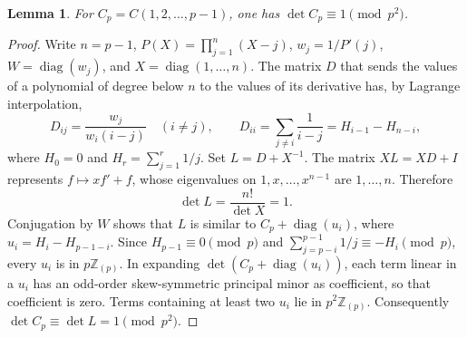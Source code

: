 \documentclass[11pt]{article}
\newtheorem{lemma}[theorem]{Lemma}
\newcommand{\Zp}{\mathbb Z_{(p)}}
\begin{document}
\begin{lemma}\label{canonical}
For $C_p=C(1,2,\ldots,p-1)$, one has
$\det C_p\equiv1\pmod{p^2}$.
\end{lemma}
\begin{proof}
Write $n=p-1$, $P(X)=\prod_{j=1}^n(X-j)$, $w_j=1/P'(j)$,
$W=\operatorname{diag}(w_j)$, and $X=\operatorname{diag}(1,\ldots,n)$.
The matrix $D$ that sends the values of a polynomial of degree below
$n$ to the values of its derivative has, by Lagrange interpolation,
\[
 D_{ij}=\frac{w_j}{w_i(i-j)}\quad(i\ne j),\qquad
 D_{ii}=\sum_{j\ne i}\frac1{i-j}=H_{i-1}-H_{n-i},
\]
where $H_0=0$ and $H_r=\sum_{j=1}^r1/j$.
Set $L=D+X^{-1}$. The matrix $XL=XD+I$ represents
$f\mapsto xf'+f$, whose eigenvalues on $1,x,\ldots,x^{n-1}$
are $1,\ldots,n$. Therefore
\[
 \det L=\frac{n!}{\det X}=1.
\]
Conjugation by $W$ shows that $L$ is similar to
$C_p+\operatorname{diag}(u_i)$, where
$u_i=H_i-H_{p-1-i}$. Since
$H_{p-1}\equiv0\pmod p$ and
$\sum_{j=p-i}^{p-1}1/j\equiv-H_i\pmod p$, every $u_i$ is in $p\Zp$.
In expanding $\det(C_p+\operatorname{diag}(u_i))$, each term linear
in a $u_i$ has an odd-order skew-symmetric principal minor as coefficient,
so that coefficient is zero. Terms containing at least two $u_i$ lie
in $p^2\Zp$. Consequently $\det C_p\equiv\det L=1\pmod{p^2}$.
\end{proof}
\end{document}
